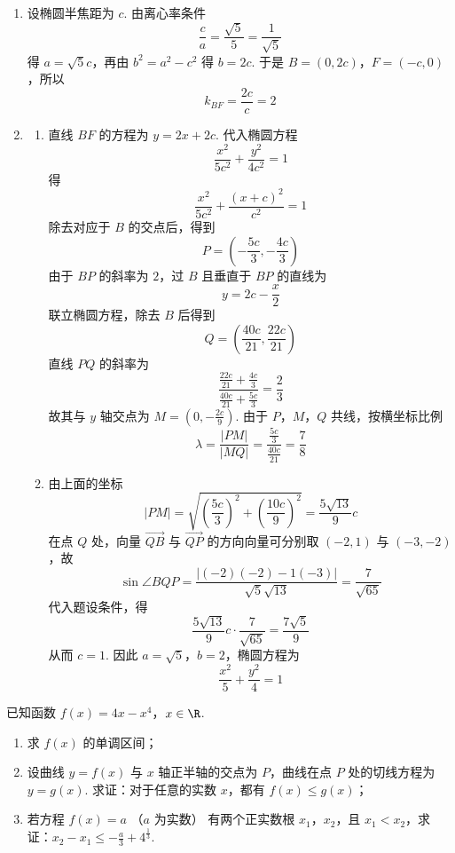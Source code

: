 \begin{solution}
\begin{enumerate}
\item 设椭圆半焦距为 \(c\). 由离心率条件
\[
\frac ca=\frac{\sqrt5}{5}=\frac1{\sqrt5}
\]
得 \(a=\sqrt5c\)，再由 \(b^2=a^2-c^2\) 得 \(b=2c\). 于是 \(B=(0,2c)\)，\(F=(-c,0)\)，所以
\[
k_{BF}=\frac{2c}{c}=2
\]

\item
\begin{enumerate}
\item 直线 \(BF\) 的方程为 \(y=2x+2c\). 代入椭圆方程
\[
\frac{x^2}{5c^2}+\frac{y^2}{4c^2}=1
\]
得
\[
\frac{x^2}{5c^2}+\frac{(x+c)^2}{c^2}=1
\]
除去对应于 \(B\) 的交点后，得到
\[
P=\left(-\frac{5c}{3},-\frac{4c}{3}\right)
\]
由于 \(BP\) 的斜率为 \(2\)，过 \(B\) 且垂直于 \(BP\) 的直线为
\[
y=2c-\frac{x}{2}
\]
联立椭圆方程，除去 \(B\) 后得到
\[
Q=\left(\frac{40c}{21},\frac{22c}{21}\right)
\]
直线 \(PQ\) 的斜率为
\[
\frac{\frac{22c}{21}+\frac{4c}{3}}{\frac{40c}{21}+\frac{5c}{3}}=\frac23
\]
故其与 \(y\) 轴交点为 \(M=(0,-\frac{2c}{9})\). 由于 \(P\)，\(M\)，\(Q\) 共线，按横坐标比例
\[
\lambda=\frac{|PM|}{|MQ|}=\frac{\frac{5c}{3}}{\frac{40c}{21}}=\frac78
\]

\item 由上面的坐标
\[
|PM|=\sqrt{\left(\frac{5c}{3}\right)^2+\left(\frac{10c}{9}\right)^2}=\frac{5\sqrt{13}}9c
\]
在点 \(Q\) 处，向量 \(\overrightarrow{QB}\) 与 \(\overrightarrow{QP}\) 的方向向量可分别取 \((-2,1)\) 与 \((-3,-2)\)，故
\[
\sin\angle BQP=\frac{|(-2)(-2)-1(-3)|}{\sqrt5\sqrt{13}}=\frac7{\sqrt{65}}
\]
代入题设条件，得
\[
\frac{5\sqrt{13}}9c\cdot\frac7{\sqrt{65}}=\frac{7\sqrt5}{9}
\]
从而 \(c=1\). 因此 \(a=\sqrt5\)，\(b=2\)，椭圆方程为
\[
\frac{x^2}{5}+\frac{y^2}{4}=1
\]
\end{enumerate}
\end{enumerate}
\end{solution}

\begin{problem}
已知函数 \(f(x) = 4x - x^4\)，\(x \in \R\).
\begin{enumerate}
\item 求 \( f(x) \) 的单调区间；
\item 设曲线 \( y = f(x) \) 与 \( x \) 轴正半轴的交点为 \(P\)，曲线在点 \(P\) 处的切线方程为 \( y = g(x) \). 求证：对于任意的实数 \( x \)，都有 \( f(x) \leqslant g(x) \)；
\item 若方程 \( f(x) = a \) （\( a \) 为实数） 有两个正实数根 \(x_1\)，\(x_2\)，且 \( x_1 < x_2 \)，求证：\( x_2 - x_1 \leqslant -\frac{a}{3} + 4^{\frac{1}{3}} \).
\end{enumerate}
\end{problem}


